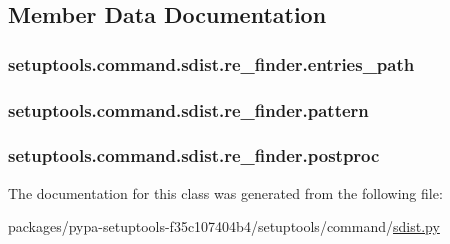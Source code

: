 \subsection{Member Data Documentation}
\hypertarget{classsetuptools_1_1command_1_1sdist_1_1re__finder_a227b74fb20dfeeee7bd77f4ffcd81937}{}
\subsubsection[{entries\+\_\+path}]{\setlength{\rightskip}{0pt plus 5cm}setuptools.\+command.\+sdist.\+re\+\_\+finder.\+entries\+\_\+path}\label{classsetuptools_1_1command_1_1sdist_1_1re__finder_a227b74fb20dfeeee7bd77f4ffcd81937}
\hypertarget{classsetuptools_1_1command_1_1sdist_1_1re__finder_a015ec89edd4d1edffe7036a570ca465d}{}
\subsubsection[{pattern}]{\setlength{\rightskip}{0pt plus 5cm}setuptools.\+command.\+sdist.\+re\+\_\+finder.\+pattern}\label{classsetuptools_1_1command_1_1sdist_1_1re__finder_a015ec89edd4d1edffe7036a570ca465d}
\hypertarget{classsetuptools_1_1command_1_1sdist_1_1re__finder_aa7d76aaaa572df58f5af876d0b4bfa43}{}
\subsubsection[{postproc}]{\setlength{\rightskip}{0pt plus 5cm}setuptools.\+command.\+sdist.\+re\+\_\+finder.\+postproc}\label{classsetuptools_1_1command_1_1sdist_1_1re__finder_aa7d76aaaa572df58f5af876d0b4bfa43}


The documentation for this class was generated from the following file\+:\begin{DoxyCompactItemize}
\item 
packages/pypa-\/setuptools-\/f35c107404b4/setuptools/command/\hyperlink{sdist_8py}{sdist.\+py}\end{DoxyCompactItemize}
